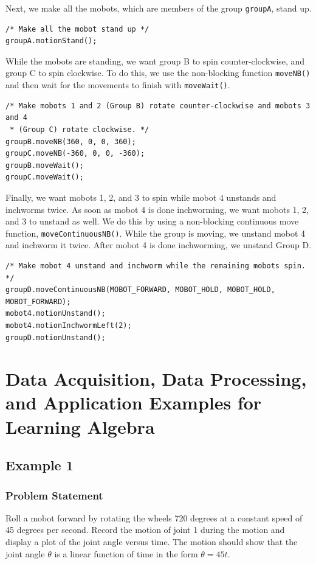 \documentclass{article}
\begin{document}
Next, we make all the mobots, which are members of the group \texttt{groupA}, 
stand up.
\begin{verbatim}
/* Make all the mobot stand up */
groupA.motionStand();
\end{verbatim}

While the mobots are standing, we want group B to spin counter-clockwise, and group
C to spin clockwise. To do this, we use the non-blocking function \texttt{moveNB()}
and then wait for the movements to finish with \texttt{moveWait()}.
\begin{verbatim}
/* Make mobots 1 and 2 (Group B) rotate counter-clockwise and mobots 3 and 4
 * (Group C) rotate clockwise. */
groupB.moveNB(360, 0, 0, 360);
groupC.moveNB(-360, 0, 0, -360);
groupB.moveWait();
groupC.moveWait();
\end{verbatim}

Finally, we want mobots 1, 2, and 3 to spin while mobot 4 unstands and inchworms twice.
As soon as mobot 4 is done inchworming, we want mobots 1, 2, and 3 to unstand as well.
We do this by using a non-blocking continuous move function, \texttt{moveContinuousNB()}.
While the group is moving, we unstand mobot 4 and inchworm it twice. After mobot 4 is
done inchworming, we unstand Group D.
\begin{verbatim}
/* Make mobot 4 unstand and inchworm while the remaining mobots spin. */
groupD.moveContinuousNB(MOBOT_FORWARD, MOBOT_HOLD, MOBOT_HOLD, MOBOT_FORWARD);
mobot4.motionUnstand();
mobot4.motionInchwormLeft(2);
groupD.motionUnstand();
\end{verbatim}

\section{Data Acquisition, Data Processing, and Application Examples for Learning Algebra}
\subsection{Example 1}
\subsubsection{Problem Statement}
Roll a mobot forward by rotating the wheels 720 degrees at a constant speed of 45 degrees per
second. Record the motion of joint 1 during the motion and display a plot
of the joint angle versus time. The motion should show that the joint angle $\theta$
is a linear function of time in the form $\theta = 45t$.
\end{document}
